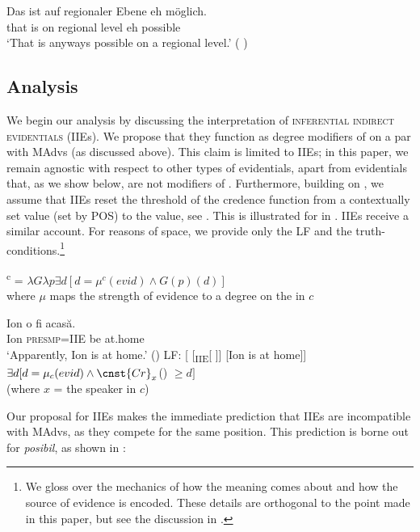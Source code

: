 \documentclass[output=paper,colorlinks,citecolor=brown,newtxmath]{langsci/langscibook}
\begin{document}
 	\ea \gll Das ist auf regionaler Ebene eh m\"oglich. \\
    	that is on regional level eh possible \\
		\glt `That is anyways possible on a regional level.' \hfill ( ) \label{ehAG}
	\z


\subsection{Analysis}
 We begin our analysis by discussing the interpretation of \textsc{inferential indirect evidentials} (IIEs). We propose that they function as degree modifiers of  on a par with MAdvs (as discussed above). This claim is limited to IIEs; in this paper, we remain agnostic with respect to other types of evidentials, apart from  evidentials that, as we show below, are not modifiers of .  Furthermore, building on \citet{davetal07}, we assume that IIEs reset the threshold of the credence function from a contextually set value (set by POS) to the  value, see . This is illustrated for  in .  IIEs receive a similar account. For reasons of space, we provide only the LF and the truth-conditions.\footnote{We gloss over the mechanics of how the  meaning comes about and how the source of evidence is encoded. These details are orthogonal to the point made in this paper, but see the discussion in \citet{koev17}.
 }

	\ea {}\textsuperscript{c} = $\lambda G\lambda p\exists d[ d = \mu^{c} (evid) \wedge G(p)(d)] $\\
    where $\mu$ maps the strength of evidence to a degree on the  in $c$ \label{sxiie}
    \z

 	\ea  \label{rom1} \ea \gll Ion o fi acasă. \\
 			Ion \textsc{presmp}=\textsc{IIE} be at.home \\
			\glt `Apparently, Ion is at home.' \hfill ()
 		\ex LF: [ [\textsubscript{IIE}[  ]] [Ion is at home]]
        \ex $\exists d[d = \mu_{c}(evid) \wedge  \cnst{Cr}_{x}$() $\geq d ]$ \\ (where $x$ = the speaker in $c$)
        \z \z


\noindent Our proposal for IIEs makes the immediate prediction that IIEs are incompatible with MAdvs, as they compete for the same position. This prediction is borne out for  \textit{posibil}, as shown in :
\end{document}
